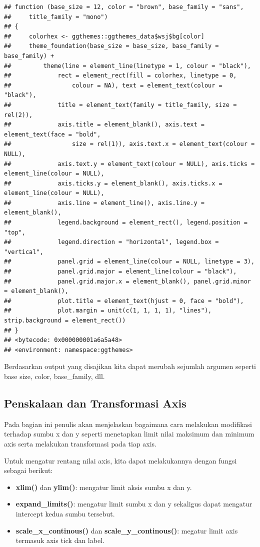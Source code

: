 \documentclass[]{book}
\providecommand{\tightlist}{%
  \setlength{\itemsep}{0pt}\setlength{\parskip}{0pt}}
\begin{document}
\begin{verbatim}
## function (base_size = 12, color = "brown", base_family = "sans", 
##     title_family = "mono") 
## {
##     colorhex <- ggthemes::ggthemes_data$wsj$bg[color]
##     theme_foundation(base_size = base_size, base_family = base_family) + 
##         theme(line = element_line(linetype = 1, colour = "black"), 
##             rect = element_rect(fill = colorhex, linetype = 0, 
##                 colour = NA), text = element_text(colour = "black"), 
##             title = element_text(family = title_family, size = rel(2)), 
##             axis.title = element_blank(), axis.text = element_text(face = "bold", 
##                 size = rel(1)), axis.text.x = element_text(colour = NULL), 
##             axis.text.y = element_text(colour = NULL), axis.ticks = element_line(colour = NULL), 
##             axis.ticks.y = element_blank(), axis.ticks.x = element_line(colour = NULL), 
##             axis.line = element_line(), axis.line.y = element_blank(), 
##             legend.background = element_rect(), legend.position = "top", 
##             legend.direction = "horizontal", legend.box = "vertical", 
##             panel.grid = element_line(colour = NULL, linetype = 3), 
##             panel.grid.major = element_line(colour = "black"), 
##             panel.grid.major.x = element_blank(), panel.grid.minor = element_blank(), 
##             plot.title = element_text(hjust = 0, face = "bold"), 
##             plot.margin = unit(c(1, 1, 1, 1), "lines"), strip.background = element_rect())
## }
## <bytecode: 0x000000001a6a5a48>
## <environment: namespace:ggthemes>
\end{verbatim}

Berdasarkan output yang disajikan kita dapat merubah sejumlah argumen
seperti base size, color, base\_family, dll.

\subsection{Penskalaan dan Transformasi
Axis}\label{penskalaan-dan-transformasi-axis}

Pada bagian ini penulis akan menjelaskan bagaimana cara melakukan
modifikasi terhadap sumbu x dan y seperti menetapkan limit nilai
maksimum dan minimum axis serta melakukan transformasi pada tiap axis.

Untuk mengatur rentang nilai axis, kita dapat melakukannya dengan fungsi
sebagai berikut:

\begin{itemize}
\tightlist
\item
  \textbf{xlim()} dan \textbf{ylim()}: mengatur limit aksis sumbu x dan
  y.
\item
  \textbf{expand\_limits()}: mengatur limit sumbu x dan y sekaligus
  dapat mengatur intercept kedua sumbu tersebut.
\item
  \textbf{scale\_x\_continous()} dan \textbf{scale\_y\_continous()}:
  megatur limit axis termasuk axis tick dan label.
\end{itemize}
\end{document}
